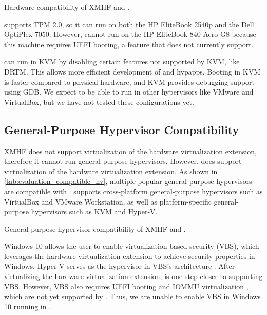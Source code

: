 \begin{table}[tbp]
	\begin{center}
	
	\caption{Hardware compatibility of XMHF and .}
	\label{tab:evaluation_compatible_hw}
	\end{center}
\end{table}

 supports TPM 2.0, so it can run on both the HP EliteBook 2540p and the Dell OptiPlex 7050. However,  cannot run on the HP EliteBook 840 Aero G8 because this machine requires UEFI booting, a feature that  does not currently support.

 can run in KVM by disabling certain features not supported by KVM, like DRTM. This allows more efficient development of  and hypapps. Booting  in KVM is faster compared to physical hardware, and KVM provides debugging support using GDB. We expect  to be able to run in other hypervisors like VMware and VirtualBox, but we have not tested these configurations yet.

\subsection{General-Purpose Hypervisor Compatibility}

XMHF does not support virtualization of the hardware virtualization extension, therefore it cannot run general-purpose hypervisors. However,  does support virtualization of the hardware virtualization extension. As shown in \ref{tab:evaluation_compatible_hv}, multiple popular general-purpose hypervisors are compatible with .  supports cross-platform general-purpose hypervisors such as VirtualBox and VMware Workstation, as well as platform-specific general-purpose hypervisors such as KVM and Hyper-V.

\begin{table}[tbp]
	\begin{center}
	
	\caption{General-purpose hypervisor compatibility of XMHF and .}
	\label{tab:evaluation_compatible_hv}
	\end{center}
\end{table}

Windows 10 allows the user to enable virtualization-based security (VBS), which leverages the hardware virtualization extension to achieve security properties in Windows. Hyper-V serves as the hypervisor in VBS's architecture \cite{yosifovich2017windows}. After virtualizing the hardware virtualization extension,  is one step closer to supporting VBS. However, VBS also requires UEFI booting and IOMMU virtualization \cite{windows_vbs}, which are not yet supported by . Thus, we are unable to enable VBS in Windows 10 running in .

